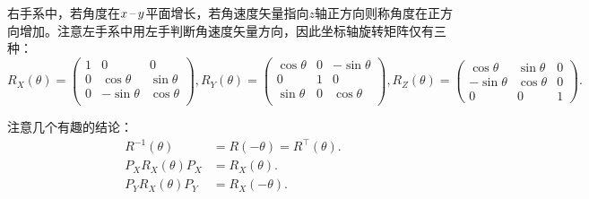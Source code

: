 \documentclass[11pt, a4paper, oneside]{ctexart}
\numberwithin{equation}{subsection}
\begin{document}
右手系中，若角度在$x\,\text{\textendash}\,y$平面增长，若角速度矢量指向$z$轴正方向则称角度在正方向增加。注意左手系中用左手判断角速度矢量方向，因此坐标轴旋转矩阵仅有三种：
\begin{equation}
R_{X}\left(\theta\right)=
\begin{pmatrix}
1 & 0 & 0\\
0 & \cos\theta & \sin\theta\\
0 & -\sin\theta & \cos\theta\\
\end{pmatrix},
R_{Y}\left(\theta\right)=
\begin{pmatrix}
\cos\theta & 0 & -\sin\theta\\
0 & 1 & 0\\
\sin\theta & 0 & \cos\theta\\
\end{pmatrix},
R_{Z}\left(\theta\right)=
\begin{pmatrix}
\cos\theta & \sin\theta & 0\\
-\sin\theta & \cos\theta & 0\\
0 & 0 & 1
\end{pmatrix}.
\end{equation}

注意几个有趣的结论：
\begin{align}
R^{-1}\left(\theta\right)&=R\left(-\theta\right)=R^\top\left(\theta\right).\\
P_XR_X\left(\theta\right)P_X&=R_X\left(\theta\right).\\
P_YR_X\left(\theta\right)P_Y&=R_X\left(-\theta\right).
\end{align}
\end{document}

